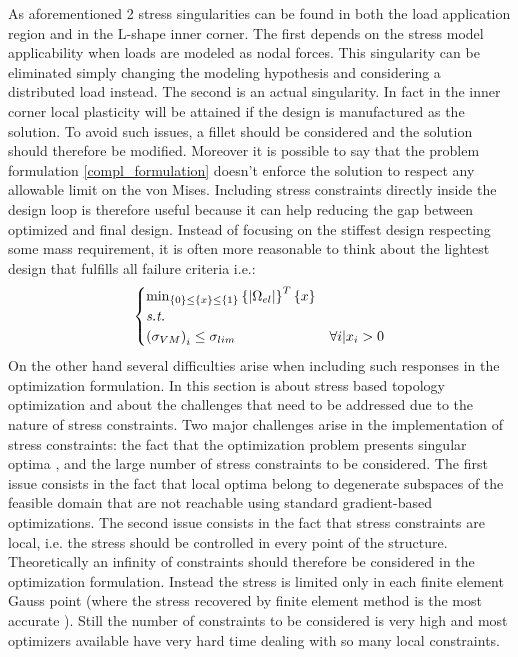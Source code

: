 As aforementioned 2 stress singularities can be found in both the load application region and in the L-shape inner corner. 
The first depends on the stress model applicability when loads are modeled as nodal forces. This singularity can be eliminated simply changing the modeling hypothesis and considering a distributed load instead. The second is an actual singularity. In fact in the inner corner local plasticity will be attained if the design is manufactured as the solution. To avoid such issues, a fillet should be considered and the solution should therefore be modified. 
Moreover it is possible to say that the problem formulation \ref{compl_formulation} doesn't enforce the solution to respect any allowable limit on the von Mises.
Including stress constraints directly inside the design loop is therefore useful because it can help reducing the gap between optimized and final design. Instead of focusing on the stiffest design respecting some mass requirement, it is often more reasonable to think about the lightest design that fulfills all failure criteria i.e.:
\begin{equation}
\label{formulation_stress}
\begin{cases}
\min_{\left\lbrace{0}\right \rbrace\leq\left\lbrace{x}\right \rbrace\leq\left\lbrace{1}\right \rbrace} {\left\lbrace{|\Omega_{el}|}\right \rbrace^T\left\lbrace{x}\right \rbrace} \\
\textit{s.t.}\\
\left(\sigma_{VM}\right)_i\leq \sigma_{lim} & \forall i|x_i>0
\end{cases}
\end{equation}
On the other hand several difficulties arise when including such responses in the optimization formulation. 
In this section is about stress based topology optimization and about the challenges that need to be addressed due to the nature of stress constraints.
Two major challenges arise in the implementation of stress constraints: the fact that the optimization problem presents singular optima \cite{kirsch1990singular,cheng1997varepsilon,rozvany2001design}, and the large number of stress constraints to be considered.
The first issue consists in the fact that local optima belong to degenerate subspaces of the feasible domain that are not reachable using standard gradient-based optimizations.  The second issue consists in the fact that stress constraints are local, i.e. the stress should be controlled in every point of the structure. Theoretically an infinity of constraints should therefore be considered in the optimization formulation. Instead the stress is limited only in each finite element Gauss point (where the stress recovered by finite element method is the most accurate \cite{zlamal1978superconvergence,zhang2006natural}). Still the number of constraints to be considered is very high and most optimizers available have very hard time dealing with so many local constraints.
